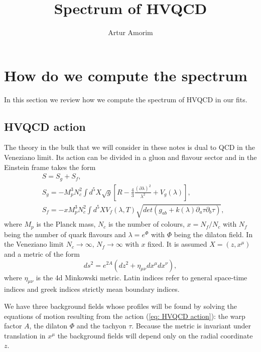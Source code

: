 \documentclass[10 pt]{article}
\title{Spectrum of HVQCD}
\author{Artur Amorim }
\date{}
\begin{document}
\maketitle

\section{How do we compute the spectrum}

In this section we review how we compute the spectrum of HVQCD in our fits.

\subsection{HVQCD action}

The theory in the bulk that we will consider in these notes is dual to QCD in the Veneziano limit. Its action can be divided in a gluon and flavour sector and in the Einstein frame takes the form
\begin{align}
&S = S_g + S_f, \\
&S_g = - M_p^3 N_c^2 \int d^5X \sqrt{g} \left[ R - \frac{4}{3} \frac{{\left( \partial \lambda \right)}^2}{\lambda^2}+ V_g \left( \lambda\right) \right], \\
&S_f = - x M_p^3 N_c^2 \int d^5 X V_f\left(\lambda, T\right) \sqrt{det\left(g_{ab} + k\left(\lambda\right) \partial_a \tau \partial_b \tau \right)},
\label{eq: HVQCD action}
\end{align}
where $M_p$ is the Planck mass, $N_c$ is the number of colours, $x = N_f / N_c$ with $N_f$ being the number of quark flavours and $\lambda = e^{\Phi}$ with $\Phi$ being the dilaton field. In the Veneziano limit $N_c \to \infty, \, N_f \to \infty$ with $x$ fixed. It is assumed $X = \left(z, x^\mu \right)$ and a metric of the form
\begin{equation}
\label{eq: metric definition}
ds^2 = e^{2 A} \left( d z^2 + \eta_{\mu \nu} dx^\mu dx^\nu \right),
\end{equation}
where $\eta_{\mu\nu}$ is the 4d Minkowski metric. Latin indices refer to general space-time indices and greek indices strictly mean boundary indices.

We have three background fields whose profiles will be found by solving the equations of motion resulting from the action (\ref{eq: HVQCD action}): the warp factor $A$, the dilaton $\Phi$ and the tachyon $\tau$. Because the metric is invariant under translation in $x^\mu$ the background fields will depend only on the radial coordinate $z$.
\end{document}
